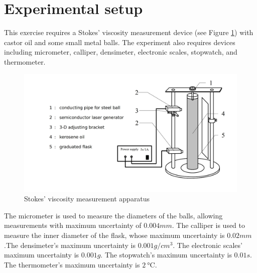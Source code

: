 \section{Experimental setup}
    This exercise requires a Stokes' viscosity measurement device (see Figure \ref{apparatus}) with castor oil and some small metal balls. The experiment also requires devices including micrometer, calliper, densimeter, electronic scales, stopwatch, and thermometer.
    \begin{figure}[htbp]
        \centering
        \includegraphics[width=0.8\linewidth]{images/1.png}
        \caption{Stokes’ viscosity measurement apparatus}
        \label{apparatus}
    \end{figure}

    The micrometer is used to measure the diameters of the balls, allowing measurements with maximum uncertainty of $0.004mm$. The calliper is used to measure the inner diameter of the flask, whose maximum uncertainty is $0.02mm$.The densimeter's maximum uncertainty is $0.001 g/cm^3$. The electronic scales' maximum uncertainty is $0.001g$. The stopwatch's maximum uncertainty is $0.01s$. The thermometer's maximum uncertainty is $\SI{2}{\degreeCelsius}$.\\